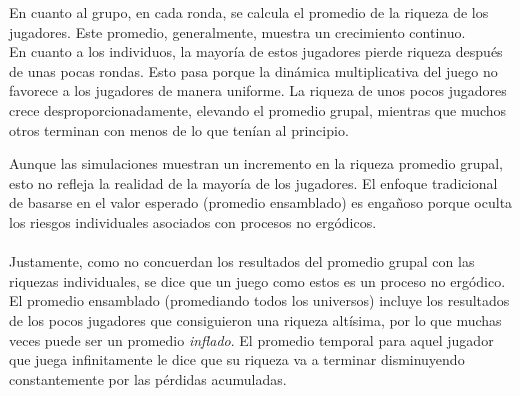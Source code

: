 \documentclass{article}
\begin{document}
             En cuanto al grupo, en cada ronda, se calcula el promedio de la riqueza de los jugadores. Este promedio, generalmente, muestra un crecimiento continuo. \\
             En cuanto a los individuos, la mayoría de estos jugadores pierde riqueza después de unas pocas rondas. Esto pasa porque la dinámica multiplicativa del juego no favorece a los jugadores de manera uniforme. La riqueza de unos pocos jugadores crece desproporcionadamente, elevando el promedio grupal, mientras que muchos otros terminan con menos de lo que tenían al principio.

             Aunque las simulaciones muestran un incremento en la riqueza promedio grupal, esto no refleja la realidad de la mayoría de los jugadores. El enfoque tradicional de basarse en el valor esperado (promedio ensamblado) es engañoso porque oculta los riesgos individuales asociados con procesos no ergódicos. \\
             \\
             Justamente, como no concuerdan los resultados del promedio grupal con las riquezas individuales, se dice que un juego como estos es un proceso no ergódico. El promedio ensamblado (promediando todos los universos) incluye los resultados de los pocos jugadores que consiguieron una riqueza altísima, por lo que muchas veces puede ser un promedio \emph{inflado}. El promedio temporal para aquel jugador que juega infinitamente le dice que su riqueza va a terminar disminuyendo constantemente por las pérdidas acumuladas.
\end{document}
